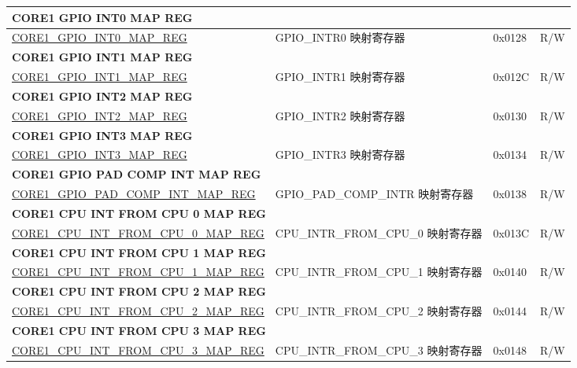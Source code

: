 \begin{longtable}{ | p{7.5cm} | p{7.2cm} | p{1.3cm} | p{1cm} | }
\multicolumn{4}{|l|}{\textbf{CORE1 GPIO INT0 MAP REG}} \\ \hline
\hyperref[regdesc:CORE1GPIOINT0MAPREG]{CORE1\_GPIO\_INT0\_MAP\_REG} & GPIO\_INTR0 映射寄存器 & 0x0128 & R/W \\ \hline
\multicolumn{4}{|l|}{\textbf{CORE1 GPIO INT1 MAP REG}} \\ \hline
\hyperref[regdesc:CORE1GPIOINT1MAPREG]{CORE1\_GPIO\_INT1\_MAP\_REG} & GPIO\_INTR1 映射寄存器 & 0x012C & R/W \\ \hline
\multicolumn{4}{|l|}{\textbf{CORE1 GPIO INT2 MAP REG}} \\ \hline
\hyperref[regdesc:CORE1GPIOINT2MAPREG]{CORE1\_GPIO\_INT2\_MAP\_REG} & GPIO\_INTR2 映射寄存器 & 0x0130 & R/W \\ \hline
\multicolumn{4}{|l|}{\textbf{CORE1 GPIO INT3 MAP REG}} \\ \hline
\hyperref[regdesc:CORE1GPIOINT3MAPREG]{CORE1\_GPIO\_INT3\_MAP\_REG} & GPIO\_INTR3 映射寄存器 & 0x0134 & R/W \\ \hline
\multicolumn{4}{|l|}{\textbf{CORE1 GPIO PAD COMP INT MAP REG}} \\ \hline
\hyperref[regdesc:CORE1GPIOPADCOMPINTMAPREG]{CORE1\_GPIO\_PAD\_COMP\_INT\_MAP\_REG} & GPIO\_PAD\_COMP\_INTR 映射寄存器 & 0x0138 & R/W \\ \hline
\multicolumn{4}{|l|}{\textbf{CORE1 CPU INT FROM CPU 0 MAP REG}} \\ \hline
\hyperref[regdesc:CORE1CPUINTFROMCPU0MAPREG]{CORE1\_CPU\_INT\_FROM\_CPU\_0\_MAP\_REG} & CPU\_INTR\_FROM\_CPU\_0 映射寄存器 & 0x013C & R/W \\ \hline
\multicolumn{4}{|l|}{\textbf{CORE1 CPU INT FROM CPU 1 MAP REG}} \\ \hline
\hyperref[regdesc:CORE1CPUINTFROMCPU1MAPREG]{CORE1\_CPU\_INT\_FROM\_CPU\_1\_MAP\_REG} & CPU\_INTR\_FROM\_CPU\_1 映射寄存器 & 0x0140 & R/W \\ \hline
\multicolumn{4}{|l|}{\textbf{CORE1 CPU INT FROM CPU 2 MAP REG}} \\ \hline
\hyperref[regdesc:CORE1CPUINTFROMCPU2MAPREG]{CORE1\_CPU\_INT\_FROM\_CPU\_2\_MAP\_REG} & CPU\_INTR\_FROM\_CPU\_2 映射寄存器 & 0x0144 & R/W \\ \hline
\multicolumn{4}{|l|}{\textbf{CORE1 CPU INT FROM CPU 3 MAP REG}} \\ \hline
\hyperref[regdesc:CORE1CPUINTFROMCPU3MAPREG]{CORE1\_CPU\_INT\_FROM\_CPU\_3\_MAP\_REG} & CPU\_INTR\_FROM\_CPU\_3 映射寄存器 & 0x0148 & R/W \\ \hline


\end{longtable}
